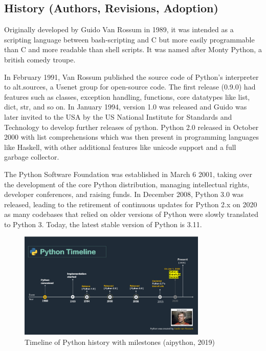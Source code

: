 \documentclass{article}
\begin{document}
\subsection*{History (Authors, Revisions, Adoption)}
Originally developed by Guido Van Rossum in 1989, it was intended as a scripting language between bash-scripting and C
but more easily programmable than C and more readable than shell scripts. It was named after Monty Python, a british comedy troupe. \par
In February 1991, Van Rossum published the source code of Python’s interpreter to alt.sources, a Usenet group for open-source code. The first release (0.9.0) had features such as classes, exception handling, functions, core datatypes like list, dict, str, and so on. In January 1994, version 1.0 was released and Guido was later invited to the USA by the US National Institute for Standards and Technology to develop further releases of python. Python 2.0 released in October 2000 with list comprehensions which was then present in programming languages like Haskell, with other additional features like unicode support and a full garbage collector. 
\par The Python Software Foundation was established in March 6 2001, taking over the development of the core Python distribution, managing intellectual rights, developer conferences, and raising funds. In December 2008, Python 3.0 was released, leading to the retirement of continuous updates for Python 2.x on 2020 as many codebases that relied on older versions of Python were slowly translated to Python 3. Today, the latest stable version of Python is 3.11.
\begin{figure}[ht]
  \centering
  \includegraphics[width=0.8\textwidth]{py_history}
  \caption{Timeline of Python history with milestones (aipython, 2019)}
\end{figure}
\newpage
\end{document}
